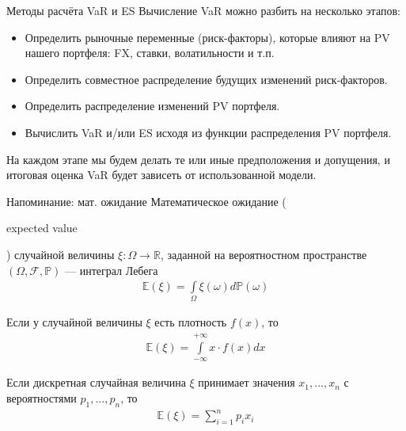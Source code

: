 \documentclass{beamer}
\newcommand{\en}[1]{\begin{otherlanguage}{english}#1\end{otherlanguage}}
\begin{document}
\begin{frame}{Методы расчёта VaR и ES}
\justify
Вычисление VaR можно разбить на несколько этапов:
\begin{itemize}
\justifying
\item Определить рыночные переменные (риск-факторы), которые влияют на PV нашего портфеля: FX, ставки, волатильности и т.п.
\item Определить совместное распределение будущих изменений риск-факторов.
\item Определить распределение изменений PV портфеля.
\item Вычислить VaR и/или ES исходя из функции распределения PV портфеля.
\end{itemize}

\justify
На каждом этапе мы будем делать те или иные предположения и допущения, и итоговая оценка VaR будет зависеть от использованной модели.
\end{frame}



\begin{frame}{Напоминание: мат. ожидание}
\justify
\alert{Математическое ожидание} (\en{expected value}) случайной величины $\xi: \Omega \to \mathbb{R}$, заданной на вероятностном пространстве $(\Omega, \mathcal{F}, \mathbb{P})$ --- интеграл Лебега
\begin{align*}
\mathbb{E}(\xi) = \int\limits_\Omega\xi(\omega)d\mathbb{P}(\omega)
\end{align*}

\justify
Если у случайной величины $\xi$ есть плотность $f(x)$, то
\begin{align*}
\mathbb{E}(\xi) = \int\limits_{-\infty}^{+\infty}x\cdot f(x)dx
\end{align*}

\justify
Если дискретная случайная величина $\xi$ принимает значения $x_1,...,x_n$ с вероятностями $p_1,...,p_n$, то
\begin{align*}
\mathbb{E}(\xi) = \sum\limits_{i=1}^{n} p_i x_i
\end{align*}
\end{frame}
\end{document}
